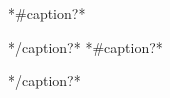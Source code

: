 {*#caption?*}
\begin{table}[H]
\caption{\small {*title*}}
\centering
{*/caption?*}
{*#caption?*}
\label{tab:{*label*}}
\end{table}
{*/caption?*}
